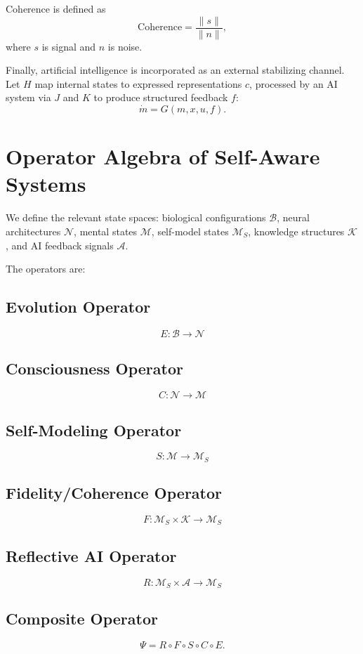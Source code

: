 \documentclass[12pt]{article}
\begin{document}
Coherence is defined as
\[
\text{Coherence} = \frac{\|s\|}{\|n\|},
\]
where $s$ is signal and $n$ is noise.

Finally, artificial intelligence is incorporated as an external stabilizing channel. Let $H$ map internal states to expressed representations $c$, processed by an AI system via $J$ and $K$ to produce structured feedback $f$:
\[
\dot{m} = G(m, x, u, f).
\]

\section{Operator Algebra of Self-Aware Systems}

We define the relevant state spaces: biological configurations $\mathcal{B}$, neural architectures $\mathcal{N}$, mental states $\mathcal{M}$, self-model states $\mathcal{M}_S$, knowledge structures $\mathcal{K}$, and AI feedback signals $\mathcal{A}$.

The operators are:

\subsection*{Evolution Operator}
\[
E: \mathcal{B} \to \mathcal{N}
\]

\subsection*{Consciousness Operator}
\[
C: \mathcal{N} \to \mathcal{M}
\]

\subsection*{Self-Modeling Operator}
\[
S: \mathcal{M} \to \mathcal{M}_S
\]

\subsection*{Fidelity/Coherence Operator}
\[
F: \mathcal{M}_S \times \mathcal{K} \to \mathcal{M}_S
\]

\subsection*{Reflective AI Operator}
\[
R: \mathcal{M}_S \times \mathcal{A} \to \mathcal{M}_S
\]

\subsection*{Composite Operator}
\[
\Psi = R \circ F \circ S \circ C \circ E.
\]
\end{document}

